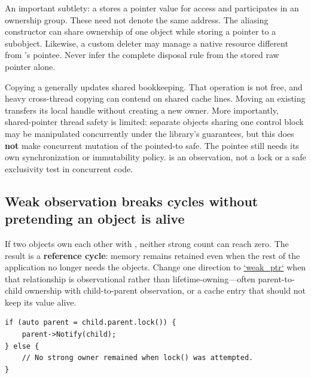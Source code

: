 An important subtlety: a  stores a pointer value for access and participates in an ownership group. These need not denote the same address. The aliasing constructor can share ownership of one object while storing a pointer to a subobject. Likewise, a custom deleter may manage a native resource different from 's pointee. Never infer the complete disposal rule from the stored raw pointer alone.

Copying a  generally updates shared bookkeeping. That operation is not free, and heavy cross-thread copying can contend on shared cache lines. Moving an existing  transfers its local handle without creating a new owner. More importantly, shared-pointer thread safety is limited: separate  objects sharing one control block may be manipulated concurrently under the library's guarantees, but this does \textbf{not} make concurrent mutation of the pointed-to  safe. The pointee still needs its own synchronization or immutability policy.  is an observation, not a lock or a safe exclusivity test in concurrent code.

\subsection{Weak observation breaks cycles without pretending an object is alive}\label{01-foundations-i-ch004-weak-observation-breaks-cycles-without-pretending-an-object-is-alive}

\hypertarget{01-foundations-i-ch004-weak-observation-breaks-cycles-without-pretending-an-object-is-alive}{}

If two objects own each other with , neither strong count can reach zero. The result is a \textbf{reference cycle}: memory remains retained even when the rest of the application no longer needs the objects. Change one direction to \hyperref[appendix-b9548675eb2b]{`weak\_ptr`} when that relationship is observational rather than lifetime-owning---often parent-to-child ownership with child-to-parent observation, or a cache entry that should not keep its value alive.

\begin{verbatim}
if (auto parent = child.parent.lock()) {
    parent->Notify(child);
} else {
    // No strong owner remained when lock() was attempted.
}
\end{verbatim}

